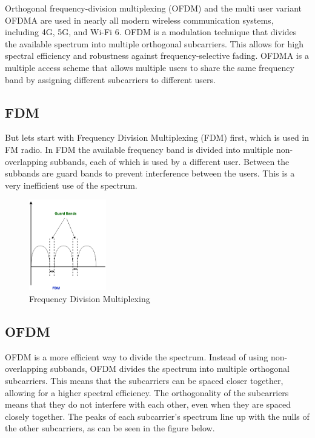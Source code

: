 Orthogonal frequency-division multiplexing (OFDM) and the multi user variant OFDMA are used in nearly all modern wireless communication systems, including 4G, 5G, and Wi-Fi 6. OFDM is a modulation technique that divides the available spectrum into multiple orthogonal subcarriers. This allows for high spectral efficiency and robustness against frequency-selective fading. OFDMA is a multiple access scheme that allows multiple users to share the same frequency band by assigning different subcarriers to different users.

\subsection{FDM}

But lets start with Frequency Division Multiplexing (FDM) first, which is used in FM radio. In FDM the available frequency band is divided into multiple non-overlapping subbands, each of which is used by a different user. Between the subbands are guard bands to prevent interference between the users. This is a very inefficient use of the spectrum.

\begin{figure}[H]
	\centering
	\includegraphics[width=0.3\textwidth]{Figures/fdm.png}
	\caption{Frequency Division Multiplexing}
\end{figure}

\subsection{OFDM}

OFDM is a more efficient way to divide the spectrum. Instead of using non-overlapping subbands, OFDM divides the spectrum into multiple orthogonal subcarriers. This means that the subcarriers can be spaced closer together, allowing for a higher spectral efficiency. The orthogonality of the subcarriers means that they do not interfere with each other, even when they are spaced closely together. The peaks of each subcarrier's spectrum line up with the nulls of the other subcarriers, as can be seen in the figure below.

